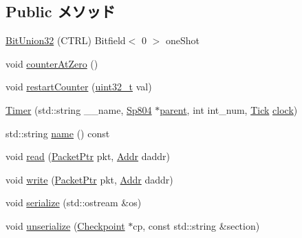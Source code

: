 \subsection*{Public メソッド}
\begin{DoxyCompactItemize}
\item 
\hyperlink{classSp804_1_1Timer_a106b41739bf22df3a12501935d39b9f8}{BitUnion32} (CTRL) Bitfield$<$ 0 $>$ oneShot
\item 
void \hyperlink{classSp804_1_1Timer_ab3116a726a55ac899fa28951b13d7453}{counterAtZero} ()
\item 
void \hyperlink{classSp804_1_1Timer_a5e2d72e72192a57c6d3f61a22d1790cc}{restartCounter} (\hyperlink{Type_8hh_a435d1572bf3f880d55459d9805097f62}{uint32\_\-t} val)
\item 
\hyperlink{classSp804_1_1Timer_a1ac56319b87382938cc537cd1e58717e}{Timer} (std::string \_\-\_\-name, \hyperlink{classSp804}{Sp804} $\ast$\hyperlink{classSp804_1_1Timer_a0e5173aee1e61e68810b199b498223b8}{parent}, int int\_\-num, \hyperlink{base_2types_8hh_a5c8ed81b7d238c9083e1037ba6d61643}{Tick} \hyperlink{classSp804_1_1Timer_a9461588ed360796ba2408cc9e90e0ab8}{clock})
\item 
std::string \hyperlink{classSp804_1_1Timer_a37627d5d5bba7f4a8690c71c2ab3cb07}{name} () const 
\item 
void \hyperlink{classSp804_1_1Timer_a6ecbcc960e1c0cd0a0f4c64e7ae58d14}{read} (\hyperlink{classPacket}{PacketPtr} pkt, \hyperlink{base_2types_8hh_af1bb03d6a4ee096394a6749f0a169232}{Addr} daddr)
\item 
void \hyperlink{classSp804_1_1Timer_a26d6a1d80de386690a8ad73932f83d96}{write} (\hyperlink{classPacket}{PacketPtr} pkt, \hyperlink{base_2types_8hh_af1bb03d6a4ee096394a6749f0a169232}{Addr} daddr)
\item 
void \hyperlink{classSp804_1_1Timer_a53e036786d17361be4c7320d39c99b84}{serialize} (std::ostream \&os)
\item 
void \hyperlink{classSp804_1_1Timer_af22e5d6d660b97db37003ac61ac4ee49}{unserialize} (\hyperlink{classCheckpoint}{Checkpoint} $\ast$cp, const std::string \&section)
\end{DoxyCompactItemize}
